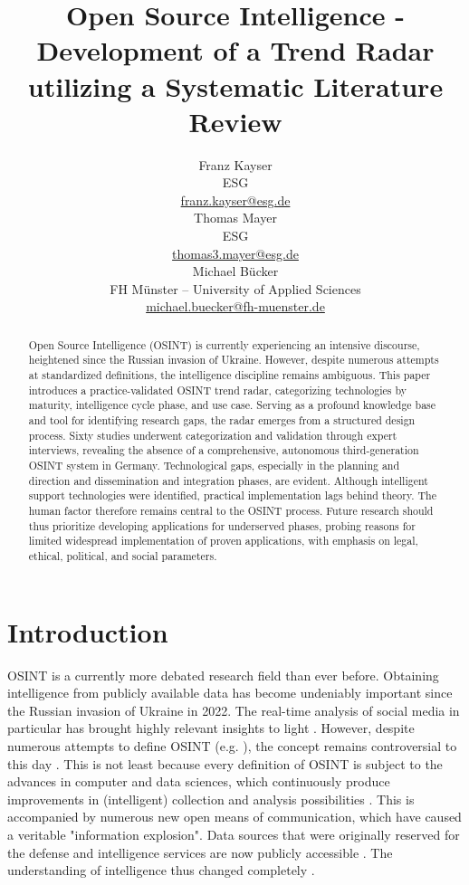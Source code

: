 \documentclass[10pt]{article}
\title{Open Source Intelligence - Development of a Trend Radar utilizing a Systematic Literature Review}
\author{Franz Kayser \\
  ESG \\
  {\underline{ franz.kayser@esg.de}} \\\And
  Thomas Mayer \\
  ESG  \\
  {\underline{ thomas3.mayer@esg.de} }\\\And 
  Michael Bücker \\
  FH Münster -- University of Applied Sciences\\
  {\underline{michael.buecker@fh-muenster.de}} \\}
\date{}
\begin{document}
\maketitle
\begin{abstract}


    Open Source Intelligence (OSINT) is currently experiencing an intensive discourse,
    heightened since the Russian invasion of Ukraine. However, despite numerous attempts
    at standardized definitions, the intelligence discipline remains ambiguous. This paper
    introduces a practice-validated OSINT trend radar, categorizing technologies by maturity,
    intelligence cycle phase, and use case. Serving as a profound knowledge base and tool for
    identifying research gaps, the radar emerges from a structured design process. Sixty
    studies underwent categorization and validation through expert interviews,
    revealing the absence of a comprehensive, autonomous third-generation OSINT
    system in Germany. Technological gaps, especially in the planning and direction and
    dissemination and integration phases, are evident. Although intelligent support
    technologies were identified, practical implementation lags behind theory. The human
    factor therefore remains central to the OSINT process. Future research should thus
    prioritize developing applications for underserved phases, probing reasons for limited
    widespread implementation of proven applications, with emphasis on legal, ethical,
    political, and social parameters.


\end{abstract}

\section{Introduction}

OSINT is a currently more debated research field than ever before. Obtaining intelligence
from publicly available data \cite{DosPassos.2017} has become undeniably important since the
Russian invasion of Ukraine in 2022. The real-time analysis of social media in particular has
brought highly relevant insights to light \cite{Hatfield.2023, SmithBoyle.24.07.2023}. However, despite
numerous attempts to define OSINT (e.g. \cite{Hwang.2022, PastorGalindo.2020, Yogish.2021}),
the concept remains controversial to this day \cite{Ghioni.2023, Ish.2022,Williams.2018}.
This is not least because every definition of OSINT is subject to the advances
in computer and data sciences, which continuously produce improvements in (intelligent)
collection and analysis possibilities \cite{Ghioni.2023, Williams.2018}. This is
accompanied by numerous new open means of communication, which have caused a veritable
"information explosion"\cite{DosPassos.2017, Hwang.2022, Yogish.2021}.
Data sources that were originally reserved for the defense and intelligence services are
now publicly accessible \cite{Hwang.2022, Williams.2018}. The understanding of
intelligence thus changed completely \cite{Dokman.2020}.
\end{document}
